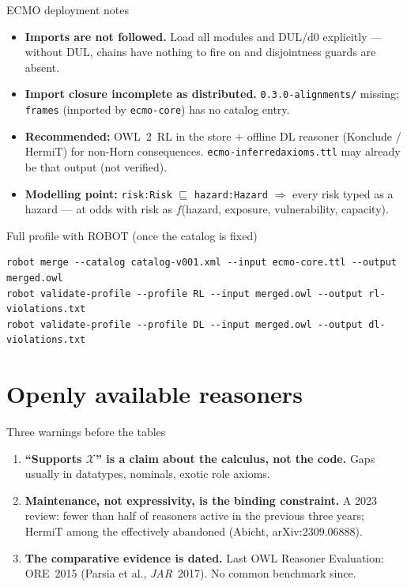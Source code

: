 \documentclass[10pt,aspectratio=169,xcolor=table]{beamer}
\newcommand{\dl}[1]{\ensuremath{\mathcal{#1}}}
\newcommand{\sub}{\sqsubseteq}
\begin{document}
\begin{frame}[fragile]{ECMO deployment notes}
  \small
  \begin{itemize}
    \item \textbf{Imports are not followed.} Load all modules and DUL/d0 explicitly ---
      without DUL, chains have nothing to fire on and disjointness guards are absent.
    \item \textbf{Import closure incomplete as distributed.} \texttt{0.3.0-alignments/}
      missing; \texttt{frames} (imported by \texttt{ecmo-core}) has no catalog entry.
    \item \textbf{Recommended:} OWL~2~RL in the store $+$ offline DL reasoner (Konclude / HermiT)
      for non-Horn consequences. \texttt{ecmo-inferredaxioms.ttl} may already be that output
      (not verified).
    \item \textbf{Modelling point:} \texttt{risk:Risk} $\sub$ \texttt{hazard:Hazard} $\Rightarrow$
      every risk typed as a hazard --- at odds with risk as $f$(hazard, exposure, vulnerability,
      capacity).
  \end{itemize}
  \begin{block}{Full profile with ROBOT (once the catalog is fixed)}
\begin{lstlisting}[language={}]
robot merge --catalog catalog-v001.xml --input ecmo-core.ttl --output merged.owl
robot validate-profile --profile RL --input merged.owl --output rl-violations.txt
robot validate-profile --profile DL --input merged.owl --output dl-violations.txt
\end{lstlisting}
  \end{block}
\end{frame}

\section{Openly available reasoners}

\begin{frame}{Three warnings before the tables}
  \begin{enumerate}
    \item \textbf{``Supports \dl{X}'' is a claim about the calculus, not the code.}
      Gaps usually in datatypes, nominals, exotic role axioms.
    \item \textbf{Maintenance, not expressivity, is the binding constraint.}
      A 2023 review: fewer than half of reasoners active in the previous three years;
      HermiT among the effectively abandoned (Abicht, arXiv:2309.06888).
    \item \textbf{The comparative evidence is dated.} Last OWL Reasoner Evaluation:
      ORE~2015 (Parsia et al., \emph{JAR}~2017). No common benchmark since.
  \end{enumerate}
\end{frame}
\end{document}
